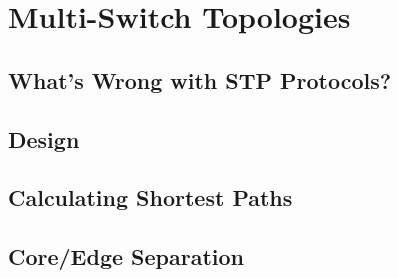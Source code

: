 
\chapter{Multi-Switch Topologies}
 \label{multiswitch_topologies}

\section{What's Wrong with STP Protocols?}
 \label{multiswitch_topologies:whats_wrong}

\section{Design}

\section{Calculating Shortest Paths}

\section{Core/Edge Separation}


